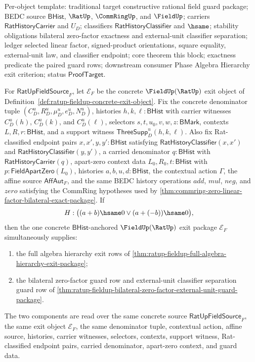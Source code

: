 Per-object template: traditional target constructive rational field guard
package; BEDC source $\mathsf{BHist}$, $\RatUp$, $\CommRingUp$, and
$\FieldUp$; carriers $\mathsf{RatHistoryCarrier}$ and $U_D$; classifiers
$\mathsf{RatHistoryClassifier}$ and $\hsame$; stability obligations bilateral
zero-factor exactness and external-unit classifier separation; ledger selected
linear factor, signed-product orientations, square equality, external-unit law,
and classifier endpoint; core theorem this block; exactness predicate the
paired guard rows; downstream consumer Phase Algebra Hierarchy exit criterion;
status $\mathsf{ProofTarget}$.

\begin{theorem}
\label{thm:ratup-fieldup-guarded-full-algebra-hierarchy-exit-package}
For $\mathsf{RatUpFieldSource}_F$, let $\mathcal E_F$ be the concrete
$\FieldUp(\RatUp)$ exit object of
Definition~\ref{def:ratup-fieldup-concrete-exit-object}. Fix the concrete
denominator tuple $(C_D^u,R_D^u,\mu_D^u,e_D^u,N_D^u)$, histories
$h,k,\ell:\mathsf{BHist}$ with carrier witnesses $C_D^u(h)$, $C_D^u(k)$, and
$C_D^u(\ell)$, selectors $s,t,u_0,v,w,z:\mathsf{BMark}$, contexts
$L,R,r:\mathsf{BHist}$, and a support witness
$\mathsf{ThreeSupp}_D^u(h,k,\ell)$. Also fix Rat-classified endpoint pairs
$x,x',y,y':\mathsf{BHist}$ satisfying
$\mathsf{RatHistoryClassifier}(x,x')$ and
$\mathsf{RatHistoryClassifier}(y,y')$, a carried denominator
$q:\mathsf{BHist}$ with $\mathsf{RatHistoryCarrier}(q)$, apart-zero context
data $L_0,R_0,t:\mathsf{BHist}$ with
$p:\mathsf{FieldApartZero}(L_0)$, histories $a,b,u,d:\mathsf{BHist}$, the
contextual action $\Gamma$, the affine source $\mathsf{AffAut}_F$, and the same
BEDC history operations $add$, $mul$, $neg$, and $zero$ satisfying the CommRing
hypotheses used by
\autoref{thm:commring-zero-linear-factor-bilateral-exact-package}. If
$$
H:\bigl((a+b)\hsame0 \lor (a+(-b))\hsame0\bigr),
$$
then the one concrete $\mathsf{BHist}$-anchored $\FieldUp(\RatUp)$ exit package
$\mathcal E_F$ simultaneously supplies:
\begin{enumerate}
  \item the full algebra hierarchy exit rows of
  \autoref{thm:ratup-fieldup-full-algebra-hierarchy-exit-package};
  \item the bilateral zero-factor guard row and external-unit classifier
  separation guard row of
  \autoref{thm:ratup-fieldup-bilateral-zero-factor-external-unit-guard-package}.
\end{enumerate}
The two components are read over the same concrete source
$\mathsf{RatUpFieldSource}_F$, the same exit object $\mathcal E_F$, the same
denominator tuple, contextual action, affine source, histories, carrier
witnesses, selectors, contexts, support witness, Rat-classified endpoint pairs,
carried denominator, apart-zero context, and guard data.
\end{theorem}

